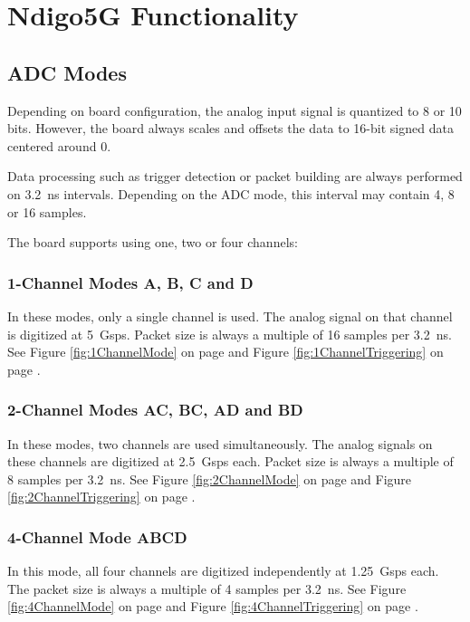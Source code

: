 \section{Ndigo5G Functionality}
\subsection{ADC Modes}

Depending on board configuration, the analog input signal is quantized to 8 or 10 bits. However, the board always scales and offsets the data to 16-bit signed data centered around 0.\par
Data processing such as trigger detection or packet building are always performed on 3.2~ns intervals. Depending on the ADC mode, this interval may contain 4, 8 or 16 samples.\par
The board supports using one, two or four channels:

\subsubsection{1-Channel Modes A, B, C and D}

In these modes, only a single channel is used. The analog signal on that channel is digitized at 5~Gsps. Packet size is always a multiple of 16 samples per 3.2~ns. See Figure \ref{fig:1ChannelMode} on page \pageref{fig:1ChannelMode} and Figure \ref{fig:1ChannelTriggering} on page \pageref{fig:1ChannelTriggering}.

\subsubsection{2-Channel Modes AC, BC, AD and BD}

In these modes, two channels are used simultaneously. The analog signals on these channels are digitized at 2.5~Gsps each. Packet size is always a multiple of 8 samples per 3.2~ns. See Figure \ref{fig:2ChannelMode} on page \pageref{fig:2ChannelMode} and Figure \ref{fig:2ChannelTriggering} on page \pageref{fig:2ChannelTriggering}.

\subsubsection{4-Channel Mode ABCD}

In this mode, all four channels are digitized independently at 1.25~Gsps each. The packet size is always a multiple of 4 samples per 3.2~ns. See Figure \ref{fig:4ChannelMode} on page \pageref{fig:4ChannelMode} and Figure \ref{fig:4ChannelTriggering} on page \pageref{fig:4ChannelTriggering}.

